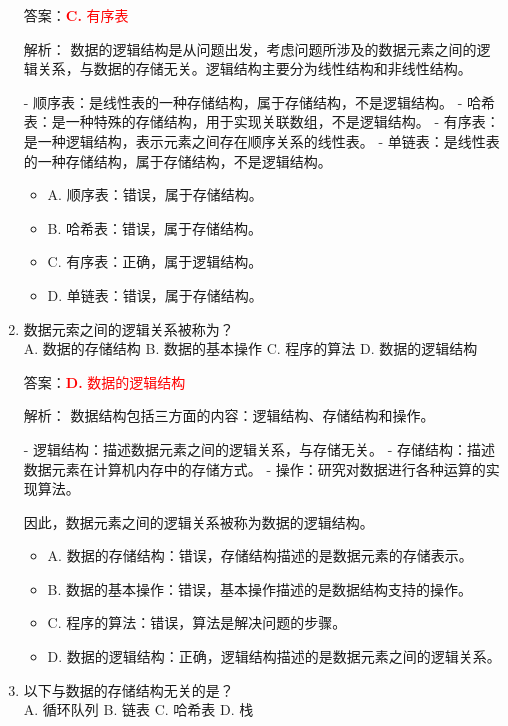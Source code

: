\documentclass[lang=cn,newtx,10pt,scheme=chinese]{../../../elegantbook}
\begin{document}
\begin{enumerate}
    答案：\textcolor{red}{\textbf{C.} 有序表}

    解析：
    数据的逻辑结构是从问题出发，考虑问题所涉及的数据元素之间的逻辑关系，与数据的存储无关。逻辑结构主要分为线性结构和非线性结构。
    
    - 顺序表：是线性表的一种存储结构，属于存储结构，不是逻辑结构。
    - 哈希表：是一种特殊的存储结构，用于实现关联数组，不是逻辑结构。
    - 有序表：是一种逻辑结构，表示元素之间存在顺序关系的线性表。
    - 单链表：是线性表的一种存储结构，属于存储结构，不是逻辑结构。

    \begin{itemize}
        \item A. 顺序表：错误，属于存储结构。
        \item B. 哈希表：错误，属于存储结构。
        \item C. 有序表：正确，属于逻辑结构。
        \item D. 单链表：错误，属于存储结构。
    \end{itemize}

    \item 数据元索之间的逻辑关系被称为？\\
    A. 数据的存储结构 \quad B. 数据的基本操作 \quad C. 程序的算法 \quad D. 数据的逻辑结构

    答案：\textcolor{red}{\textbf{D.} 数据的逻辑结构}

    解析：
    数据结构包括三方面的内容：逻辑结构、存储结构和操作。
    
    - 逻辑结构：描述数据元素之间的逻辑关系，与存储无关。
    - 存储结构：描述数据元素在计算机内存中的存储方式。
    - 操作：研究对数据进行各种运算的实现算法。
    
    因此，数据元素之间的逻辑关系被称为数据的逻辑结构。

    \begin{itemize}
        \item A. 数据的存储结构：错误，存储结构描述的是数据元素的存储表示。
        \item B. 数据的基本操作：错误，基本操作描述的是数据结构支持的操作。
        \item C. 程序的算法：错误，算法是解决问题的步骤。
        \item D. 数据的逻辑结构：正确，逻辑结构描述的是数据元素之间的逻辑关系。
    \end{itemize}

    \item 以下与数据的存储结构无关的是？\\
    A. 循环队列 \quad B. 链表 \quad C. 哈希表 \quad D. 栈


\end{enumerate}
\end{document}
